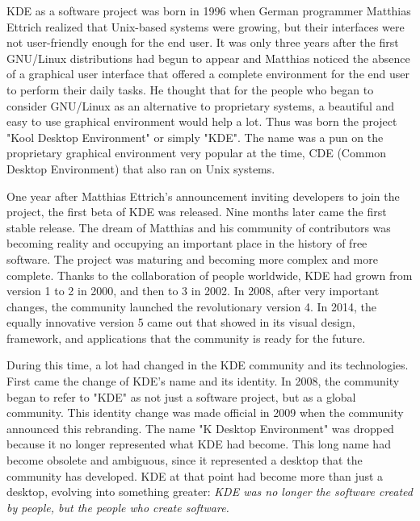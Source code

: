 

\noindent{}KDE as a software project was born in 1996 when German programmer Matthias Ettrich realized that Unix-based systems were growing, but their interfaces were not user-friendly enough for the end user. It was only three years after the first GNU/Linux distributions had begun to appear and Matthias noticed the absence of a graphical user interface that offered a complete environment for the end user to perform their daily tasks. He thought that for the people who began to consider GNU/Linux as an alternative to proprietary systems, a beautiful and easy to use graphical environment would help a lot. Thus was born the project "Kool Desktop Environment" or simply "KDE". The name was a pun on the proprietary graphical environment very popular at the time, CDE (Common Desktop Environment) that also ran on Unix systems.

One year after Matthias Ettrich's announcement inviting developers to join the project, the first beta of KDE was released. Nine months later came the first stable release. The dream of Matthias and his community of contributors was becoming reality and occupying an important place in the history of free software. The project was maturing and becoming more complex and more complete. Thanks to the collaboration of people worldwide, KDE had grown from version 1 to 2 in 2000, and then to 3 in 2002. In 2008, after very important changes, the community launched the revolutionary version 4. In 2014, the equally innovative version 5 came out that showed in its visual design, framework, and applications that the community is ready for the future.

During this time, a lot had changed in the KDE community and its technologies. First came the change of KDE's name and its identity. In 2008, the community began to refer to "KDE" as not just a software project, but as a global community. This identity change was made official in 2009 when the community announced this rebranding. The name "K Desktop Environment" was dropped because it no longer represented what KDE had become. This long name had become obsolete and ambiguous, since it represented a desktop that the community has developed. KDE at that point had become more than just a desktop, evolving into something greater: \textit{KDE was no longer the software created by people, but the people who create software.} 

